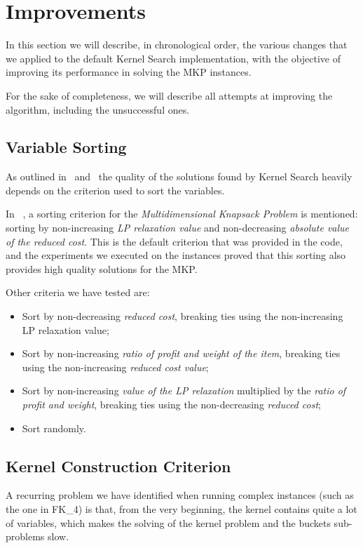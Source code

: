 \chapter{Improvements}\label{ch:improvements}
In this section we will describe, in chronological order, the various changes
that we applied to the default Kernel Search implementation,
with the objective of improving its performance
in solving the MKP instances.

For the sake of completeness, we will describe all attempts at improving
the algorithm, including the unsuccessful ones.


\section{Variable Sorting}
As outlined in~\cite{kernel:2010} and~\cite{kernel:2012} the quality of
the solutions found by Kernel Search heavily depends on the criterion used to sort the variables.

In ~\cite{kernel:2010}, a sorting criterion for the \textit{Multidimensional Knapsack Problem} is mentioned:
sorting by non-increasing \textit{LP relaxation value} and non-decreasing \textit{absolute value of the reduced cost}.
This is the default criterion that was provided in the code, and
the experiments we executed on the instances proved that this sorting also
provides high quality solutions for the MKP\@.

Other criteria we have tested are:
\begin{itemize}
    \item Sort by non-decreasing \textit{reduced cost}, breaking ties using the non-increasing {LP relaxation value};
    \item Sort by non-increasing \textit{ratio of profit and weight of the item}, breaking ties using the
    non-increasing \textit{reduced cost value};
    \item Sort by non-increasing \textit{value of the LP relaxation} multiplied by the \textit{ratio of profit and
    weight},    breaking ties using the non-decreasing \textit{reduced cost};
    \item Sort randomly.
\end{itemize}


\section{Kernel Construction Criterion}\label{sec:kernel_criteria}
A recurring problem we have identified when running complex
instances (such as the one in FK\_4) is that,
from the very beginning, the kernel contains quite a lot of variables,
which makes the solving of the kernel problem and the buckets sub-problems slow.


